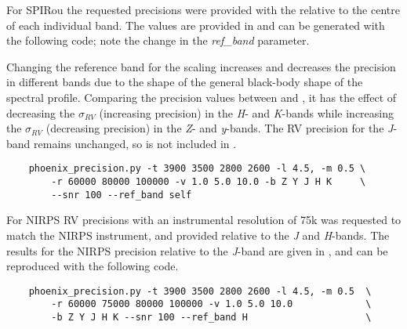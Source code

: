 For {SPIRou} the requested precisions were provided with the \snr{} relative to the centre of each individual band.
The values are provided in  and can be generated with the following code; note the change in the \emph{ref\_band} parameter.


Changing the reference band for the \snr{} scaling increases and decreases the precision in different bands due to the shape of the general black-body shape of the spectral profile.
Comparing the precision values between  and , it has the effect of decreasing the $\sigma_{RV}$ (increasing precision) in the \emph{H}- and \emph{K}-bands while increasing the $\sigma_{RV}$ (decreasing precision) in the \emph{Z}- and \emph{y}-bands.
The RV precision for the \emph{J}-band remains unchanged, so is not included in .


\begin{lstlisting}
    phoenix_precision.py -t 3900 3500 2800 2600 -l 4.5, -m 0.5 \
        -r 60000 80000 100000 -v 1.0 5.0 10.0 -b Z Y J H K     \
        --snr 100 --ref_band self
\end{lstlisting}


For {NIRPS} RV precisions with an instrumental resolution of 75k was requested to match the {NIRPS} instrument, and provided relative to the \emph{J} and \emph{H}-bands.
The results for the {NIRPS} precision relative to the \emph{J}-band are given in , and can be reproduced with the following code.

\begin{lstlisting}
    phoenix_precision.py -t 3900 3500 2800 2600 -l 4.5, -m 0.5  \
        -r 60000 75000 80000 100000 -v 1.0 5.0 10.0             \
        -b Z Y J H K --snr 100 --ref_band H                     \
\end{lstlisting}








